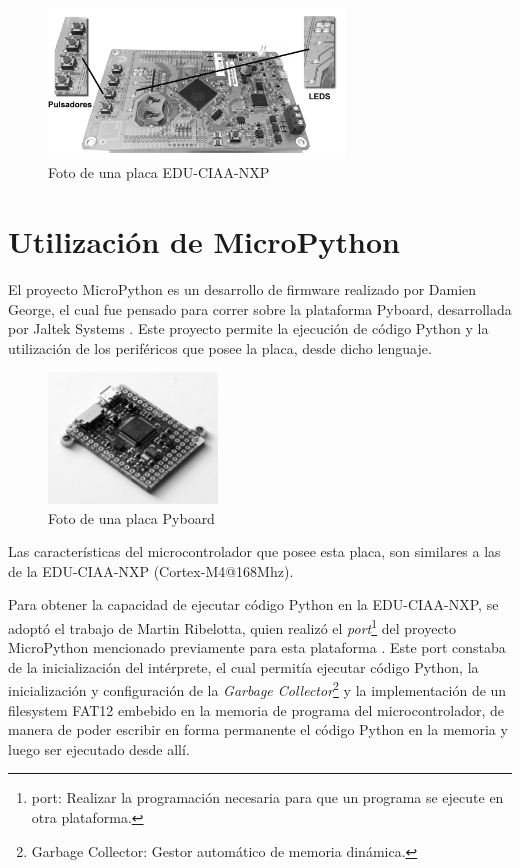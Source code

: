 \begin{figure}[h]
  \centering
    \includegraphics[width=0.7\textwidth]{Figures/fig_educiaa_placa}
  \caption{Foto de una placa EDU-CIAA-NXP}
  \label{fig:educiaaPlaca}
\end{figure}


\section{Utilización de MicroPython}
\label{sec:micropython}

El proyecto MicroPython \cite{micropython} es un desarrollo de firmware realizado por Damien George, el cual fue pensado para correr sobre la plataforma Pyboard, desarrollada por Jaltek Systems \cite{jaltek}. Este proyecto permite la ejecución de código Python y la utilización de los periféricos que posee la placa, desde dicho lenguaje.

\begin{figure}[ht]
  \centering
    \includegraphics[width=0.4\textwidth]{Figures/fig_pyboard}
  \caption{Foto de una placa Pyboard}
  \label{fig:pyboardPlaca}
\end{figure}

Las características del microcontrolador que posee esta placa, son similares a las de la EDU-CIAA-NXP (Cortex-M4@168Mhz).

Para obtener la capacidad de ejecutar código Python en la EDU-CIAA-NXP, se adoptó el trabajo de Martin Ribelotta, quien realizó el \textit{port}\footnote{port: Realizar la programación necesaria para que un programa se ejecute en otra plataforma.} del proyecto MicroPython mencionado previamente para esta plataforma \cite{portmicropythonribelotta}.
Este port constaba de la inicialización del intérprete, el cual permitía ejecutar código Python, la inicialización y configuración de la \textit{Garbage Collector}\footnote{Garbage Collector: Gestor automático de memoria dinámica.} y la implementación de un filesystem FAT12 embebido en la memoria de programa del microcontrolador, de manera de poder escribir en forma permanente el código Python en la memoria y luego ser ejecutado desde allí. 

